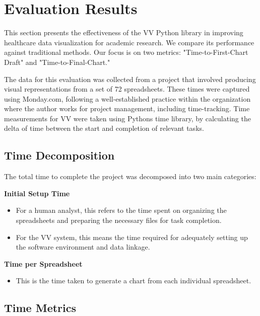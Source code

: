\section{Evaluation Results}\label{evaluation-results}

This section presents the effectiveness of the VV Python library in
improving healthcare data visualization for academic research. We
compare its performance against traditional methods. Our focus is on two
metrics: "Time-to-First-Chart Draft" and "Time-to-Final-Chart."

The data for this evaluation was collected from a project that involved
producing visual representations from a set of 72 spreadsheets. These
times were captured using Monday.com, following a well-established
practice within the organization where the author works for project
management, including time-tracking. Time measurements for VV were taken
using Python\textquotesingle s time library, by calculating the delta of
time between the start and completion of relevant tasks.

\subsection{Time Decomposition}\label{time-decomposition}

The total time to complete the project was decomposed into two main
categories:

\textbf{Initial Setup Time}

\begin{itemize}
\item
  For a human analyst, this refers to the time spent on organizing the
  spreadsheets and preparing the necessary files for task completion.
\item
  For the VV system, this means the time required for adequately setting
  up the software environment and data linkage.
\end{itemize}

\textbf{Time per Spreadsheet}

\begin{itemize}
\item
  This is the time taken to generate a chart from each individual
  spreadsheet.
\end{itemize}

\subsection{Time Metrics}\label{time-metrics}

